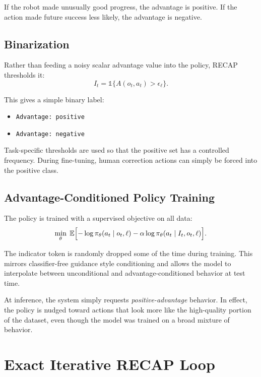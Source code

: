 \documentclass[11pt]{article}
\begin{document}
If the robot made unusually good progress, the advantage is positive. If the action made future success less likely, the advantage is negative.

\subsection{Binarization}

Rather than feeding a noisy scalar advantage value into the policy, RECAP thresholds it:
\[
I_t = \mathbb{1}\{A(o_t, a_t) > \epsilon_{\ell}\}.
\]

This gives a simple binary label:
\begin{itemize}[leftmargin=1.5em]
  \item \texttt{Advantage: positive}
  \item \texttt{Advantage: negative}
\end{itemize}

Task-specific thresholds are used so that the positive set has a controlled frequency. During fine-tuning, human correction actions can simply be forced into the positive class.

\subsection{Advantage-Conditioned Policy Training}

The policy is trained with a supervised objective on all data:
\[
\min_{\theta}\; \mathbb{E}\Bigl[
-\log \pi_{\theta}(a_t \mid o_t, \ell)
- \alpha \log \pi_{\theta}(a_t \mid I_t, o_t, \ell)
\Bigr].
\]

The indicator token is randomly dropped some of the time during training. This mirrors classifier-free guidance style conditioning and allows the model to interpolate between unconditional and advantage-conditioned behavior at test time.

At inference, the system simply requests \emph{positive-advantage} behavior. In effect, the policy is nudged toward actions that look more like the high-quality portion of the dataset, even though the model was trained on a broad mixture of behavior.

\section{Exact Iterative RECAP Loop}
\end{document}

